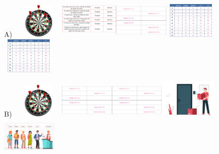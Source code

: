 \begin{escolha}
\begin{escolha}
{{{{A)
\includegraphics[width=0.98131in,height=0.65625in]{media/image108.png}\includegraphics[width=1.10972in,height=0.74212in]{media/image109.png}\includegraphics[width=1.02736in,height=0.68704in]{media/image110.png}\includegraphics[width=1.01042in,height=0.67572in]{media/image111.png}\includegraphics[width=1.01042in,height=0.67572in]{media/image111.png}

B)
\includegraphics[width=0.98131in,height=0.65625in]{media/image108.png}\includegraphics[width=1.02736in,height=0.68704in]{media/image110.png}\includegraphics[width=1.02736in,height=0.68704in]{media/image110.png}\includegraphics[width=1.09268in,height=0.73073in]{media/image112.png}\includegraphics[width=1.04264in,height=0.69727in]{media/image113.png}

}}}}
\end{escolha}
\end{escolha}
